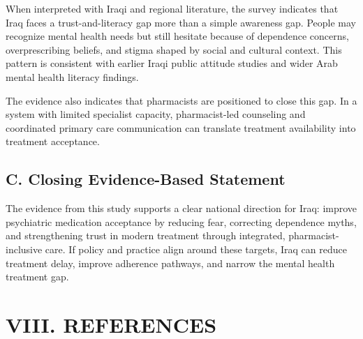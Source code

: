 When interpreted with Iraqi and regional literature, the survey
indicates that Iraq faces a trust-and-literacy gap more than a simple
awareness gap. People may recognize mental health needs but still
hesitate because of dependence concerns, overprescribing beliefs, and
stigma shaped by social and cultural context. This pattern is consistent
with earlier Iraqi public attitude studies and wider Arab mental health
literacy findings.

The evidence also indicates that pharmacists are positioned to close
this gap. In a system with limited specialist capacity, pharmacist-led
counseling and coordinated primary care communication can translate
treatment availability into treatment acceptance.

\subsection{C. Closing Evidence-Based
Statement}\label{c.-closing-evidence-based-statement}

The evidence from this study supports a clear national direction for
Iraq: improve psychiatric medication acceptance by reducing fear,
correcting dependence myths, and strengthening trust in modern treatment
through integrated, pharmacist-inclusive care. If policy and practice
align around these targets, Iraq can reduce treatment delay, improve
adherence pathways, and narrow the mental health treatment gap.

\section{VIII. REFERENCES}\label{viii.-references}

